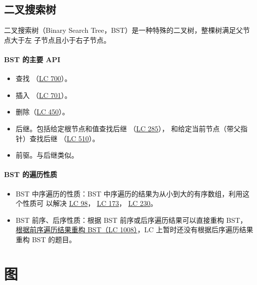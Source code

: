 \subsection{二叉搜索树}

二叉搜索树（Binary Search Tree，BST）是一种特殊的二叉树，整棵树满足父节点大于左
子节点且小于右子节点。

\paragraph{BST 的主要 API}
\begin{itemize}
  \item 查找
    （\href{https://leetcode.com/problems/search-in-a-binary-search-tree}{LC
      700}）。
  \item 插入
    （\href{https://leetcode.com/problems/insert-into-a-binary-search-tree}{LC
      701}）。
  \item 删除（\href{https://leetcode.com/problems/delete-node-in-a-bst}{LC 450}）。
  \item 后继。包括给定根节点和值查找后继
    （\href{https://leetcode.com/problems/inorder-successor-in-bst}{LC 285}），
    和给定当前节点（带父指针）查找后继
    （\href{https://leetcode.com/problems/inorder-successor-in-bst-ii}{LC 510}）。
  \item 前驱。与后继类似。
\end{itemize}

\paragraph{BST 的遍历性质}
\begin{itemize}
\item BST 中序遍历的性质：BST 中序遍历的结果为从小到大的有序数组，利用这个性质可
  以解决
  \href{https://leetcode.com/problems/validate-binary-search-tree}
  {LC 98}，
  \href{https://leetcode.com/problems/binary-search-tree-iterator}
  {LC 173}，
  \href{https://leetcode.com/problems/kth-smallest-element-in-a-bst}
  {LC 230}。
\item BST 前序、后序性质：根据 BST 前序或后序遍历结果可以直接重构 BST，
  \href{https://leetcode.com/problems/construct-binary-search-tree-from-preorder-traversal}
  {根据前序遍历结果重构 BST（LC 1008）}，LC 上暂时还没有根据后序遍历结果重构 BST
  的题目。
\end{itemize}

\section{图}

